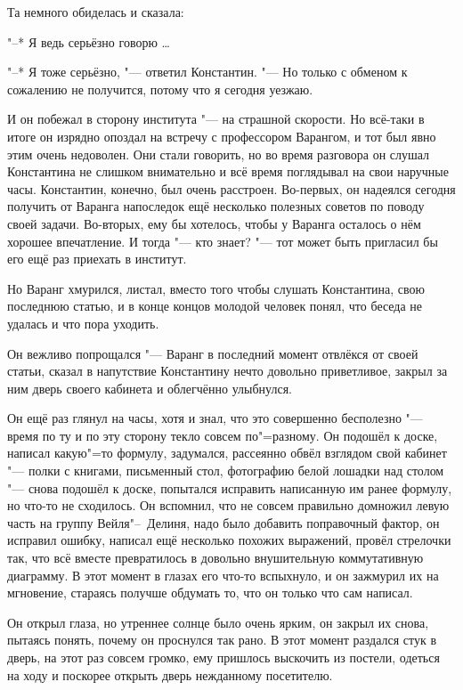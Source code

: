 Та немного обиделась и сказала:

"--* Я ведь серьёзно говорю \ldots

"--* Я тоже серьёзно, "--- ответил Константин.
"--- Но только с обменом к сожалению не получится, потому что я сегодня уезжаю.

И он побежал в сторону института "--- на страшной скорости.
Но всё-таки в итоге он изрядно опоздал на встречу с профессором Варангом, и тот
был явно этим очень недоволен.
Они стали говорить, но во время разговора он слушал Константина не слишком
внимательно и всё время поглядывал на свои наручные часы.
Константин, конечно, был очень расстроен.
Во-первых, он надеялся сегодня получить от Варанга напоследок ещё несколько
полезных советов по поводу своей задачи.
Во-вторых, ему бы хотелось, чтобы у Варанга осталось о нём хорошее впечатление.
И тогда "--- кто знает? "--- тот может быть пригласил бы его ещё раз приехать в
институт.

Но Варанг хмурился, листал, вместо того чтобы слушать Константина, свою
последнюю статью, и в конце концов молодой человек понял, что беседа не удалась
и что пора уходить.

Он вежливо попрощался "--- Варанг в последний момент отвлёкся от своей статьи,
сказал в напутствие Константину нечто довольно приветливое, закрыл за ним дверь
своего кабинета и облегчённо улыбнулся.

Он ещё раз глянул на часы, хотя и знал, что это совершенно бесполезно "--- время
по ту и по эту сторону текло совсем по"=разному.
Он подошёл к доске, написал какую"=то формулу, задумался, рассеянно обвёл
взглядом свой кабинет "--- полки с книгами, письменный стол, фотографию белой
лошадки над столом "--- снова подошёл к доске, попытался исправить написанную
им ранее формулу, но что-то не сходилось.
Он вспомнил, что не совсем правильно домножил левую часть на группу
Вейля"--~Делиня, надо было добавить поправочный фактор, он исправил ошибку,
написал ещё несколько похожих выражений, провёл стрелочки так, что всё вместе
превратилось в довольно внушительную коммутативную диаграмму.
В этот момент в глазах его что-то вспыхнуло, и он зажмурил их на мгновение,
стараясь получше обдумать то, что он только что сам написал.

Он открыл глаза, но утреннее солнце было очень ярким, он закрыл их снова,
пытаясь понять, почему он проснулся так рано.
В этот момент раздался стук в дверь, на этот раз совсем громко, ему пришлось
выскочить из постели, одеться на ходу и поскорее открыть дверь нежданному
посетителю.

